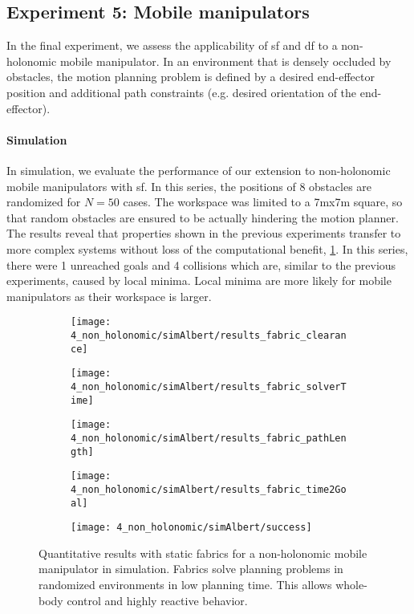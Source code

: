 \subsection{Experiment 5: Mobile manipulators}%
\label{sub:experiment_5_mobile_manipulators}

In the final experiment, we assess the applicability of \ac{sf} and \ac{df} to a 
non-holonomic mobile manipulator. In an environment that is densely occluded by obstacles,
the motion planning problem is defined by a desired end-effector position and additional
path constraints (e.g. desired orientation of the end-effector).
\paragraph{Simulation}
In simulation, we evaluate the performance of our extension to non-holonomic
mobile manipulators with \ac{sf}. In this series, the positions of 8 obstacles
are randomized for $N=50$ cases. The workspace was limited to a
7mx7m square, so that random obstacles are ensured to be actually hindering the
motion planner. The results reveal that properties shown in the previous
experiments transfer to more complex systems without loss of the computational
benefit, \cref{fig:experiment5_simAlbert_results}. In this series, there were
1 unreached goals and 4 collisions which are, similar
to the previous experiments, caused by local minima. Local minima are more
likely for mobile manipulators as their workspace is larger.
%
\begin{figure}[h]
  \centering
  \begin{subfigure}{1.0\linewidth}
    \centering
    \texttt{[image: 4\_non\_holonomic/simAlbert/results\_fabric\_clearance]}
  \end{subfigure}
  \begin{subfigure}{1.0\linewidth}
    \centering
    \texttt{[image: 4\_non\_holonomic/simAlbert/results\_fabric\_solverTime]}
  \end{subfigure}
  \begin{subfigure}{1.0\linewidth}
    \centering
    \texttt{[image: 4\_non\_holonomic/simAlbert/results\_fabric\_pathLength]}
  \end{subfigure}
  \begin{subfigure}{1.0\linewidth}
    \centering
    \texttt{[image: 4\_non\_holonomic/simAlbert/results\_fabric\_time2Goal]}
  \end{subfigure}
  \begin{subfigure}{1.0\linewidth}
    \centering
    \texttt{[image: 4\_non\_holonomic/simAlbert/success]}
  \end{subfigure}
  \caption{Quantitative results with static fabrics for a 
    non-holonomic mobile manipulator in simulation. Fabrics solve planning problems in
    randomized environments in low planning time. This allows whole-body control and highly
    reactive behavior.
  }%
  \label{fig:experiment5_simAlbert_results}
\end{figure}
